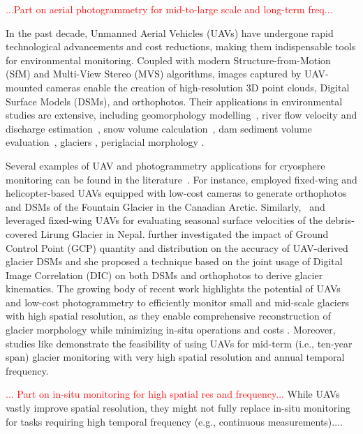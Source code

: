 \textcolor{red}{...Part on aerial photogrammetry for mid-to-large scale and long-term freq...}

In the past decade, Unmanned Aerial Vehicles (UAVs) have undergone rapid technological advancements and cost reductions,
making them indispensable tools for environmental monitoring. 
Coupled with modern Structure-from-Motion (SfM) \citep{Westoby2012} and Multi-View Stereo (MVS) \citep{Seitz2006} algorithms, 
images captured by UAV-mounted cameras enable the creation of high-resolution 3D point clouds, Digital Surface Models (DSMs),
and orthophotos. 
Their applications in environmental studies are extensive, including geomorphology modelling~\citep{Cook2017, James2017_3duncertainty}, 
river flow velocity and discharge estimation~\citep{Detert2017,Ioli2020}, 
snow volume calculation~\citep{DeMichele2016, Buhler2016, Avanzi2018},
dam sediment volume evaluation~\citep{Pagliari2016}, glaciers \citep{Immerzeel2014, Chudley2019, Groos2019}, 
periglacial morphology \citep{Sledz2021}.

Several examples of UAV and photogrammetry applications for cryosphere monitoring can be found in the literature~\citep{Bhardwaj2016, Gaffey2020}.
For instance, \cite{Whitehead2013} employed fixed-wing and helicopter-based UAVs equipped with low-cost cameras to generate orthophotos 
and DSMs of the Fountain Glacier in the Canadian Arctic. 
Similarly,~\cite{Immerzeel2014} and \cite{kraaijenbrink2016} leveraged fixed-wing UAVs for evaluating seasonal surface velocities of the debris-covered
Lirung Glacier in Nepal. 
\cite{Gindraux2017} further investigated the impact of Ground Control Point (GCP) quantity and distribution on the accuracy of UAV-derived glacier DSMs 
and she proposed a technique based on the joint usage of Digital Image Correlation (DIC) on both DSMs and orthophotos to derive glacier kinematics.
The growing body of recent work highlights the potential of UAVs and low-cost photogrammetry to efficiently monitor small and mid-scale 
glaciers with high spatial resolution, as they enable comprehensive reconstruction of glacier morphology while minimizing in-situ operations and
costs \citep{Benoit2019, Chudley2019, Jouvet2020, Cao2021, Lamsters2022, belloni2023}.
Moreover, studies like \cite{ioli2021mid} demonstrate the feasibility of using UAVs for mid-term (i.e., ten-year span) glacier monitoring with 
very high spatial resolution and annual temporal frequency.
 
\textcolor{red}{... Part on in-situ monitoring for high spatial res and frequency...}
While UAVs vastly improve spatial resolution, they might not fully replace in-situ monitoring for tasks requiring high temporal frequency 
(e.g., continuous measurements)....




